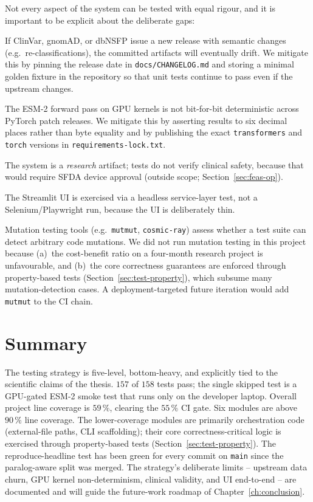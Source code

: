 \documentclass[11pt,a4paper,oneside]{report}
\begin{document}
Not every aspect of the system can be tested with equal
rigour, and it is important to be explicit about the
deliberate gaps:

\begin{description}[leftmargin=1.6em, itemsep=0.2em]
\item[External-data churn.] If ClinVar, gnomAD, or
  dbNSFP issue a new release with semantic changes (e.g.\
  re-classifications), the committed artifacts will
  eventually drift. We mitigate this by pinning the
  release date in \texttt{docs/CHANGELOG.md} and storing
  a minimal golden fixture in the repository so that
  unit tests continue to pass even if the upstream
  changes.
\item[GPU non-determinism.] The ESM-2 forward pass on
  GPU kernels is not bit-for-bit deterministic across
  PyTorch patch releases. We mitigate this by asserting
  results to six decimal places rather than byte
  equality and by publishing the exact
  \texttt{transformers} and \texttt{torch} versions in
  \texttt{requirements-lock.txt}.
\item[Clinical validity.] The system is a
  \emph{research} artifact; tests do not verify clinical
  safety, because that would require SFDA device
  approval (outside scope; Section~\ref{sec:feas-op}).
\item[UI end-to-end.] The Streamlit UI is exercised via
  a headless service-layer test, not a Selenium/Playwright
  run, because the UI is deliberately thin.
\item[Mutation testing is not employed.] Mutation testing
  tools (e.g.\ \texttt{mutmut}, \texttt{cosmic-ray}) assess
  whether a test suite can detect arbitrary code mutations.
  We did not run mutation testing in this project because
  (a)~the cost-benefit ratio on a four-month research
  project is unfavourable, and (b)~the core correctness
  guarantees are enforced through property-based tests
  (Section~\ref{sec:test-property}), which subsume many
  mutation-detection cases. A deployment-targeted future
  iteration would add \texttt{mutmut} to the CI chain.
\end{description}

\section{Summary}
\label{sec:test-summary}

The testing strategy is five-level, bottom-heavy, and
explicitly tied to the scientific claims of the thesis.
$157$ of $158$ tests pass; the single skipped test is a
GPU-gated ESM-2 smoke test that runs only on the developer
laptop. Overall project line coverage is $59\,\%$, clearing
the $55\,\%$ CI gate. Six modules are above $90\,\%$ line
coverage. The lower-coverage modules are primarily
orchestration code (external-file paths, CLI scaffolding);
their core correctness-critical logic is exercised through
property-based tests (Section~\ref{sec:test-property}). The
reproduce-headline test has been
green for every commit on \texttt{main} since the
paralog-aware split was merged. The strategy's deliberate
limits -- upstream data churn, GPU kernel non-determinism,
clinical validity, and UI end-to-end -- are documented and
will guide the future-work roadmap of
Chapter~\ref{ch:conclusion}.
\end{document}
